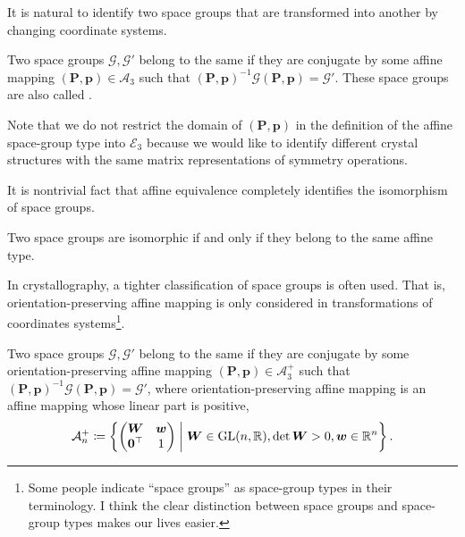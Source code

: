 It is natural to identify two space groups that are transformed into another by changing coordinate systems.
\begin{screen}
  \begin{defn}
    Two space groups $\mathcal{G}, \mathcal{G}'$ belong to the same  if they are conjugate by some affine mapping $(\bm{P}, \bm{p}) \in \mathcal{A}_{3}$ such that $(\bm{P}, \bm{p})^{-1} \mathcal{G} (\bm{P}, \bm{p}) = \mathcal{G}'$.
    These space groups are also called .
  \end{defn}
\end{screen}
Note that we do not restrict the domain of $(\bm{P}, \bm{p})$ in the definition of the affine space-group type into $\mathcal{E}_{3}$ because we would like to identify different crystal structures with the same matrix representations of symmetry operations.

It is nontrivial fact that affine equivalence completely identifies the isomorphism of space groups.

\begin{screen}
  \begin{them}[Bieberbach]
    Two space groups are isomorphic if and only if they belong to the same affine type.
  \end{them}
\end{screen}

In crystallography, a tighter classification of space groups is often used.
That is, orientation-preserving affine mapping is only considered in transformations of coordinates systems\footnote{
  Some people indicate ``space groups'' as space-group types in their terminology.
  I think the clear distinction between space groups and space-group types makes our lives easier.
}.

\begin{screen}
  \begin{defn}
    Two space groups $\mathcal{G}, \mathcal{G}'$ belong to the same  if they are conjugate by some orientation-preserving affine mapping $(\bm{P}, \bm{p}) \in \mathcal{A}^{+}_{3}$ such that $(\bm{P}, \bm{p})^{-1} \mathcal{G} (\bm{P}, \bm{p}) = \mathcal{G}'$, where orientation-preserving affine mapping is an affine mapping whose linear part is positive,
    \begin{align}
      \mathcal{A}^{+}_{n} \coloneqq \left\{  \begin{pmatrix} \bm{W} & \bm{w} \\ \bm{0}^{\top} & 1 \end{pmatrix}  \mathrel{}\middle|\mathrel{}  \bm{W} \in \mathrm{GL}(n, \mathbb{R}), \det \bm{W} > 0, \bm{w} \in \mathbb{R}^{n}  \right\}.
    \end{align}
  \end{defn}
\end{screen}

